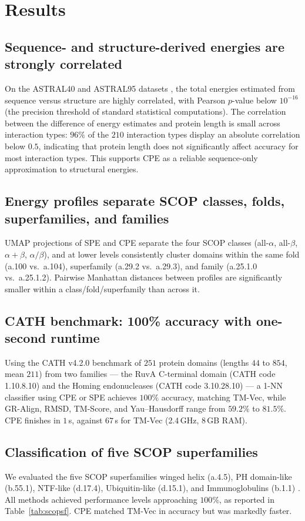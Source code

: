 \documentclass[11pt]{article}
\begin{document}
\section{Results}

\subsection{Sequence- and structure-derived energies are strongly correlated}
On the ASTRAL40 and ASTRAL95 datasets \cite{chandonia2022astral}, the total energies estimated from sequence versus structure are highly correlated, with Pearson $p$-value below $10^{-16}$ (the precision threshold of standard statistical computations). The correlation between the difference of energy estimates and protein length is small across interaction types: $96\%$ of the $210$ interaction types display an absolute correlation below $0.5$, indicating that protein length does not significantly affect accuracy for most interaction types. This supports CPE as a reliable sequence-only approximation to structural energies.

\subsection{Energy profiles separate SCOP classes, folds, superfamilies, and families}
UMAP projections of SPE and CPE separate the four SCOP classes (all-$\alpha$, all-$\beta$, $\alpha+\beta$, $\alpha/\beta$), and at lower levels consistently cluster domains within the same fold (a.100 vs.\ a.104), superfamily (a.29.2 vs.\ a.29.3), and family (a.25.1.0 vs.\ a.25.1.2). Pairwise Manhattan distances between profiles are significantly smaller within a class/fold/superfamily than across it.

\subsection{CATH benchmark: 100\% accuracy with one-second runtime}
Using the CATH v4.2.0 benchmark of $251$ protein domains (lengths $44$ to $854$, mean $211$) from two families --- the RuvA C-terminal domain (CATH code 1.10.8.10) and the Homing endonucleases (CATH code 3.10.28.10) --- a 1-NN classifier using CPE or SPE achieves $100\%$ accuracy, matching TM-Vec, while GR-Align, RMSD, TM-Score, and Yau--Hausdorff range from $59.2\%$ to $81.5\%$. CPE finishes in $1$\,s, against $67$\,s for TM-Vec (2.4\,GHz, 8\,GB RAM).

\subsection{Classification of five SCOP superfamilies}
We evaluated the five SCOP superfamilies winged helix (a.4.5), PH domain-like (b.55.1), NTF-like (d.17.4), Ubiquitin-like (d.15.1), and Immunoglobulins (b.1.1) \cite{murzin1995scop}. All methods achieved performance levels approaching $100\%$, as reported in Table~\ref{tab:scopsf}. CPE matched TM-Vec in accuracy but was markedly faster.
\end{document}
